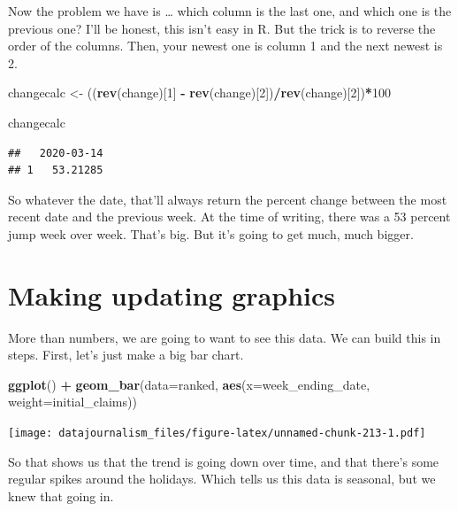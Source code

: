 \documentclass[]{book}
\newenvironment{Shaded}{\begin{snugshade}}{\end{snugshade}}
\newcommand{\DataTypeTok}[1]{\textcolor[rgb]{0.13,0.29,0.53}{#1}}
\newcommand{\DecValTok}[1]{\textcolor[rgb]{0.00,0.00,0.81}{#1}}
\newcommand{\KeywordTok}[1]{\textcolor[rgb]{0.13,0.29,0.53}{\textbf{#1}}}
\newcommand{\NormalTok}[1]{#1}
\newcommand{\OperatorTok}[1]{\textcolor[rgb]{0.81,0.36,0.00}{\textbf{#1}}}
\newcommand{\StringTok}[1]{\textcolor[rgb]{0.31,0.60,0.02}{#1}}
\begin{document}
Now the problem we have is \ldots{} which column is the last one, and which one is the previous one? I'll be honest, this isn't easy in R. But the trick is to reverse the order of the columns. Then, your newest one is column 1 and the next newest is 2.

\begin{Shaded}
\begin{Highlighting}[]
\NormalTok{changecalc <-}\StringTok{ }\NormalTok{((}\KeywordTok{rev}\NormalTok{(change)[}\DecValTok{1}\NormalTok{] }\OperatorTok{-}\StringTok{ }\KeywordTok{rev}\NormalTok{(change)[}\DecValTok{2}\NormalTok{])}\OperatorTok{/}\KeywordTok{rev}\NormalTok{(change)[}\DecValTok{2}\NormalTok{])}\OperatorTok{*}\DecValTok{100}

\NormalTok{changecalc}
\end{Highlighting}
\end{Shaded}

\begin{verbatim}
##   2020-03-14
## 1   53.21285
\end{verbatim}

So whatever the date, that'll always return the percent change between the most recent date and the previous week. At the time of writing, there was a 53 percent jump week over week. That's big. But it's going to get much, much bigger.

\hypertarget{making-updating-graphics}{%
\section{Making updating graphics}\label{making-updating-graphics}}

More than numbers, we are going to want to see this data. We can build this in steps. First, let's just make a big bar chart.

\begin{Shaded}
\begin{Highlighting}[]
\KeywordTok{ggplot}\NormalTok{() }\OperatorTok{+}\StringTok{ }
\StringTok{  }\KeywordTok{geom_bar}\NormalTok{(}\DataTypeTok{data=}\NormalTok{ranked, }\KeywordTok{aes}\NormalTok{(}\DataTypeTok{x=}\NormalTok{week_ending_date, }\DataTypeTok{weight=}\NormalTok{initial_claims)) }
\end{Highlighting}
\end{Shaded}

\texttt{[image: datajournalism\_files/figure-latex/unnamed-chunk-213-1.pdf]}

So that shows us that the trend is going down over time, and that there's some regular spikes around the holidays. Which tells us this data is seasonal, but we knew that going in.
\end{document}
